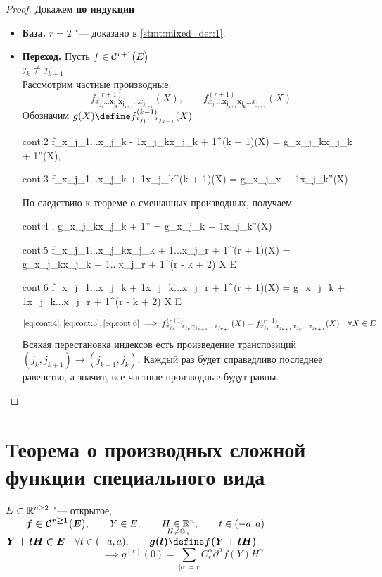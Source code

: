 \begin{proof}
	Докажем \textbf{по индукции}
	\begin{itemize}
		\item \textbf{База.} $ r = 2 $ "--- доказано в \autoref{stmt:mixed_der:1}.
		\item \textbf{Переход.}
		Пусть $ f \in \Cont[r + 1]{E} $ \\
		$ j_k \ne j_{k + 1} $ \\
		Рассмотрим частные производные:
		$$ f_{x_{j_1}...\bm{x_{j_k}x_{j_{k + 1}}}...x_{j_{r + 1}}}^{(r + 1)}(X), \qquad f_{x_{j_1}...\bm{x_{j_{k + 1}}x_{j_k}}...x_{j_{r + 1}}}^{(r + 1)}(X) $$
		Обозначим $ g(X) \define f_{x_{j_1}...x_{j_{k - 1}}}^{(k - 1)}(X) $
		\begin{equ}{cont:2}
			f_{x_{j_1}...x_{j_{k - 1}}x_{j_k}x_{j_{k + 1}}}^{(k + 1)}(X) = g_{x_{j_k}x_{j_{k + 1}}}''(X), \qquad
		\end{equ}
		\begin{equ}{cont:3}
			f_{x_{j_1}...x_{j_{k + 1}}x_{j_k}}^{(k + 1)}(X) = g_{x_{j_{x + 1}}x_{j_k}}''(X)
		\end{equ}
		По следствию к теореме о смешанных производных, получаем
		\begin{equ}{cont:4}
			,  \implies  g_{x_{j_k}x_{j_{k + 1}}}'' = g_{x_{j_{k + 1}}x_{j_k}}''(X)
		\end{equ}
		\begin{equ}{cont:5}
			 \implies f_{x_{j_1}...x_{j_k}x_{j_{k + 1}}...x_{j_{r + 1}}}^{(r + 1)}(X) = g_{x_{j_k}x_{j_{k + 1}}...x_{j_{r + 1}}}^{(r - k + 2)} \quad \forall X \in E
		\end{equ}
		\begin{equ}{cont:6}
			 \implies f_{x_{j_1}...x_{j_{k + 1}}x_{j_k}...x_{j_{r + 1}}}^{(r + 1)}(X) = g_{x_{j_{k + 1}}x_{j_k}...x_{j_{r + 1}}}^{(r - k + 2)} \quad \forall X \in E
		\end{equ}
		$$ \eref{cont:4}, \eref{cont:5}, \eref{cont:6} \implies f_{x_{j_1}...x_{j_k}x_{j_{k + 1}}...x_{j_{r + 1}}}^{(r + 1)}(X) = f_{x_{j_1}...x_{j_{k + 1}}x_{j_k}...x_{j_{r + 1}}}^{(r + 1)}(X) \quad \forall X \in E $$
		Всякая перестановка индексов есть произведение транспозиций $ (j_k, j_{k + 1}) \to (j_{k + 1}, j_k) $. Каждый раз будет справедливо последнее равенство, а значит, все частные производные будут равны.
	\end{itemize}
\end{proof}

\section{Теорема о производных сложной функции специального вида}
\begin{theorem}
	$ E \sub \R^{n \ge 2} $ "--- открытое, $ \qquad \bm{f \in \Cont[r \ge 1]{E}}, \qquad Y \in E, \qquad \underset{H \ne \On}{H \in \R^n}, \qquad t \in (-a, a) $ \\
	$ \bm{Y + tH \in E} \quad \forall t \in (-a, a), \qquad \bm{g(t) \define f(Y + tH)} $
	$$ \implies g^{(r)}(0) = \sum_{|\alpha| = r} C_r^\alpha \partial^\alpha f(Y) H^\alpha $$
\end{theorem}


